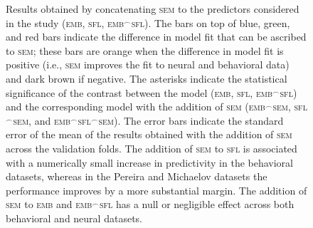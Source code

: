 \begin{figure}[htp]
\begin{center}
{}
\end{center}
\caption{Results obtained by concatenating \textsc{sem} to the predictors considered in the study (\textsc{emb}, \textsc{sfl}, \textsc{emb}$^\frown$\textsc{sfl}). The bars on top of blue, green, and red bars indicate the difference in model fit that can be ascribed to \textsc{sem}; these bars are orange when the difference in model fit is positive (i.e., \textsc{sem} improves the fit to neural and behavioral data) and dark brown if negative. The asterisks indicate the statistical significance of the contrast between the  model (\textsc{emb}, \textsc{sfl}, \textsc{emb}$^\frown$\textsc{sfl}) and the corresponding model with the addition of \textsc{sem} (\textsc{emb}$^\frown$\textsc{sem}, \textsc{sfl}$^\frown$\textsc{sem}, and \textsc{emb}$^\frown$\textsc{sfl}$^\frown$\textsc{sem}). The error bars indicate the standard error of the mean of the results obtained with the addition of \textsc{sem} across the validation folds. The addition of \textsc{sem} to \textsc{sfl} is associated with a numerically small increase in predictivity in the behavioral datasets, whereas in the Pereira and Michaelov datasets the performance improves by a more substantial margin. The addition of \textsc{sem} to \textsc{emb} and \textsc{emb}$^\frown$\textsc{sfl} has a null or negligible effect across both behavioral and neural datasets. }
\label{fig:sem}

\end{figure}
